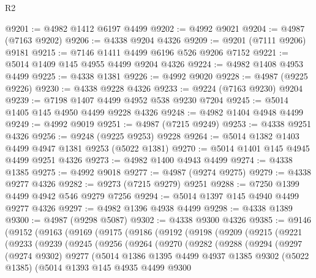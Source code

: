 \begin{lexlean}{R2}
\begin{coremodule}
@9201 := @4982 @1412 @6197 @4499
@9202 := @4992 @9021
@9204 := @4987 (@7163 @9202)
@9206 := @4338 @9204 @4326
@9209 := @9201 (@7111 @9206) @9181
@9215 := @7146 @1411 @4499 @6196 @526 @9206 @7152
@9221 := @5014 @1409 @145 @4955 @4499 @9204 @4326
@9224 := @4982 @1408 @4953 @4499
@9225 := @4338 @1381
@9226 := @4992 @9020
@9228 := @4987 (@9225 @9226)
@9230 := @4338 @9228 @4326
@9233 := @9224 (@7163 @9230) @9204
@9239 := @7198 @1407 @4499 @4952 @538 @9230 @7204
@9245 := @5014 @1405 @145 @4950 @4499 @9228 @4326
@9248 := @4982 @1404 @4948 @4499
@9249 := @4992 @9019
@9251 := @4987 (@7215 @9249)
@9253 := @4338 @9251 @4326
@9256 := @9248 (@9225 @9253) @9228
@9264 := @5014 @1382 @1403 @4499 @4947 @1381 @9253 (@5022 @1381)
@9270 := @5014 @1401 @145 @4945 @4499 @9251 @4326
@9273 := @4982 @1400 @4943 @4499
@9274 := @4338 @1385
@9275 := @4992 @9018
@9277 := @4987 (@9274 @9275)
@9279 := @4338 @9277 @4326
@9282 := @9273 (@7215 @9279) @9251
@9288 := @7250 @1399 @4499 @4942 @546 @9279 @7256
@9294 := @5014 @1397 @145 @4940 @4499 @9277 @4326
@9297 := @4982 @1396 @4938 @4499
@9298 := @4338 @1389
@9300 := @4987 (@9298 @5087)
@9302 := @4338 @9300 @4326
@9385 := @9146
    (@9152
      (@9163
        (@9169
          (@9175
            (@9186
              (@9192
                (@9198
                  (@9209
                    (@9215
                      (@9221
                        (@9233
                          (@9239
                            (@9245
                              (@9256
                                (@9264
                                  (@9270
                                    (@9282
                                      (@9288
                                        (@9294
                                          (@9297
                                            (@9274 @9302)
                                            @9277
                                            (@5014
                                              @1386
                                              @1395
                                              @4499
                                              @4937
                                              @1385
                                              @9302
                                              (@5022 @1385)
                                              (@5014
                                                @1393
                                                @145
                                                @4935
                                                @4499
                                                @9300

\end{coremodule}
\end{lexlean}

